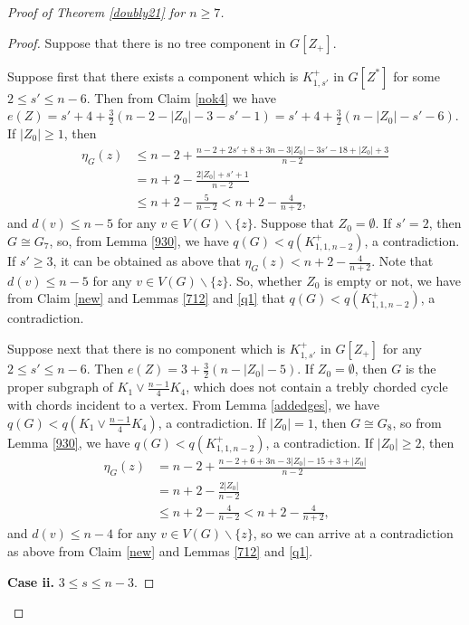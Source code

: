\documentclass[12pt]{article}
\begin{document}
\begin{proof}[Proof of Theorem \ref{doubly21} for $n\ge 7$]
\begin{proof}
Suppose that there is no tree component in $G[Z_+]$.




Suppose first that there exists a component which is $K_{1,s'}^+$ in $G[Z^*]$ for some $2\le s'\le n-6$. Then from Claim \ref{nok4} we have $e(Z)= s'+4+\frac{3}{2}\left(n-2-|Z_0|-3-s'-1\right)=s'+4+\frac{3}{2}\left(n-|Z_0|-s'-6\right)$.
If $|Z_0|\ge 1$, then
\begin{align*}
\eta_G(z)&\le n-2+\frac{n-2+2s'+8+3n-3|Z_0|-3s'-18+|Z_0|+3}{n-2}\\
&=n+2-\frac{2|Z_0|+s'+1}{n-2}\\
&\le n+2-\frac{5}{n-2}<n+2-\frac{4}{n+2},
\end{align*}
and  $d(v)\le n-5$ for any $v\in V(G)\backslash\{z\}$.
Suppose that $Z_0=\emptyset$. If $s'=2$, then $G\cong G_{7}$, so,
from Lemma \ref{930}, we have $q(G)<q(K_{1,1,n-2}^+)$, a contradiction.
If $s'\ge 3$, it  can be obtained as above that $\eta_{G}(z)<n+2-\frac{4}{n+2}$.
Note that $d(v)\le n-5$ for any $v\in V(G)\backslash\{z\}$.
So, whether $Z_0$ is empty or not, we have from Claim \ref{new} and Lemmas \ref{712} and \ref{q1} that $q(G)<q(K_{1,1,n-2}^+)$, a contradiction.


Suppose next that there is no component which is $K_{1,s'}^+$ in $G[Z_+]$ for any $2\le s'\le n-6$. Then $e(Z)=3+\frac{3}{2}\left(n-|Z_0|-5\right)$.
If  $Z_0=\emptyset$, then $G$ is the proper subgraph of $K_1\vee \frac{n-1}{4}K_4$,
which does not contain a trebly chorded cycle with chords incident to a vertex.
From Lemma \ref{addedges}, we have $q(G)<q(K_1\vee \frac{n-1}{4}K_4)$, a contradiction.
If $|Z_0|=1$, then $G\cong G_{8}$, so
from Lemma \ref{930}, we have $q(G)<q(K_{1,1,n-2}^+)$, a contradiction.
If $|Z_0|\ge 2$, then
\begin{align*}
\eta_G(z)&=n-2+\frac{n-2+6+3n-3|Z_0|-15+3+|Z_0|}{n-2}\\
&=n+2-\frac{2|Z_0|}{n-2}\\
&\le n+2-\frac{4}{n-2}<n+2-\frac{4}{n+2},
\end{align*}
and  $d(v)\le n-4$ for any $v\in V(G)\backslash\{z\}$, so we can arrive at a contradiction as above from
Claim \ref{new} and Lemmas \ref{712} and \ref{q1}.



\noindent
{\bf Case ii.}   $3\le s\le n-3$.



\end{proof}
\end{proof}
\end{document}
